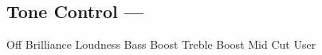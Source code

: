 \subsection[Tone Control]{Tone Control --- \UiKey{\SET}}









































Off
Brilliance
Loudness
Bass Boost
Treble Boost
Mid Cut
User
